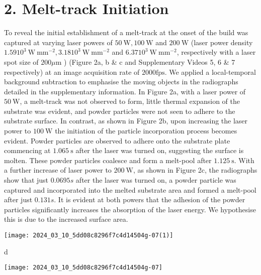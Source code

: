 \documentclass[10pt]{article}
\begin{document}
\section*{2. Melt-track Initiation}
To reveal the initial establishment of a melt-track at the onset of the build was captured at varying laser powers of $50 \mathrm{~W}, 100 \mathrm{~W}$ and $200 \mathrm{~W}$ (laser power density $1.5910^{3} \mathrm{~W} \mathrm{~mm}^{-2}, 3.1810^{3} \mathrm{~W} \mathrm{~mm}^{-2}$ and $6.3710^{3} \mathrm{~W} \mathrm{~mm}^{-2}$, respectively with a laser spot size of $200 \mu \mathrm{m}$ ) (Figure 2a, b \& c and Supplementary Videos 5, 6 \& 7 respectively) at an image acquisition rate of $2000 \mathrm{fps}$. We applied a local-temporal background subtraction to emphasise the moving objects in the radiographs detailed in the supplementary information. In Figure 2a, with a laser power of $50 \mathrm{~W}$, a melt-track was not observed to form, little thermal expansion of the substrate was evident, and powder particles were not seen to adhere to the substrate surface. In contrast, as shown in Figure 2b, upon increasing the laser power to $100 \mathrm{~W}$ the initiation of the particle incorporation process becomes evident. Powder particles are observed to adhere onto the substrate plate commencing at $1.065 \mathrm{~s}$ after the laser was turned on, suggesting the surface is molten. These powder particles coalesce and form a melt-pool after $1.125 \mathrm{~s}$. With a further increase of laser power to $200 \mathrm{~W}$, as shown in Figure 2c, the radiographs show that just $0.0695 s$ after the laser was turned on, a powder particle was captured and incorporated into the melted substrate area and formed a melt-pool after just $0.131 s$. It is evident at both powers that the adhesion of the powder particles significantly increases the absorption of the laser energy. We hypothesise this is due to the increased surface area.

\begin{center}
\texttt{[image: 2024\_03\_10\_5dd08c8296f7c4d14504g-07(1)]}
\end{center}

d

\begin{center}
\texttt{[image: 2024\_03\_10\_5dd08c8296f7c4d14504g-07]}
\end{center}
\end{document}
